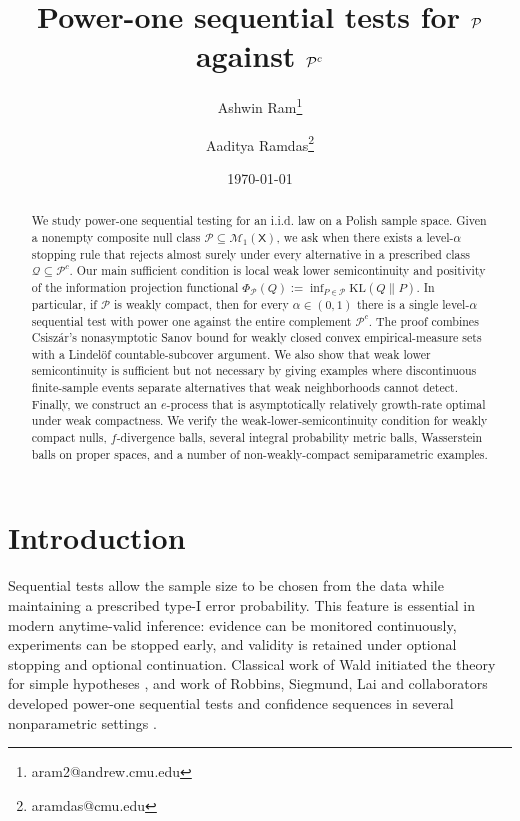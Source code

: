 \documentclass[11pt]{article}
\author[]{Ashwin Ram\thanks{aram2@andrew.cmu.edu} }
\author[]{Aaditya Ramdas\thanks{aramdas@cmu.edu}}
\affil[]{Carnegie Mellon University}
\title{Power-one sequential tests for \texorpdfstring{$\Pcal$ against $\Pcal^c$}{P against P-complement}}
\date{\today}
\newcommand{\KL}{\mathrm{KL}}
\newcommand{\Pcal}{\mathcal{P}}
\newcommand{\Qcal}{\mathcal{Q}}
\newcommand{\X}{\mathsf{X}}
\theoremstyle{definition}
\theoremstyle{definition}
\begin{document}
\maketitle


\begin{abstract}
We study power-one sequential testing for an i.i.d. law on a Polish sample space.  Given a nonempty composite null class $\Pcal\subseteq\mathcal M_1(\X)$, we ask when there exists a level-$\alpha$ stopping rule that rejects almost surely under every alternative in a prescribed class $\Qcal\subseteq\Pcal^c$.  Our main sufficient condition is local weak lower semicontinuity and positivity of the information projection functional
\(
\Phi_\Pcal(Q):=\inf_{P\in\Pcal}\KL(Q\|P).
\)
In particular, if $\Pcal$ is weakly compact, then for every $\alpha\in(0,1)$ there is a single level-$\alpha$ sequential test with power one against the entire complement $\Pcal^c$.  The proof combines Csisz\'ar's nonasymptotic Sanov bound for weakly closed convex empirical-measure sets with a Lindel\"of countable-subcover argument.  We also show that weak lower semicontinuity is sufficient but not necessary by giving examples where discontinuous finite-sample events separate alternatives that weak neighborhoods cannot detect.
Finally, we construct an $e$-process that is asymptotically relatively growth-rate optimal under weak compactness.  
We verify the weak-lower-semicontinuity condition for weakly compact nulls, $f$-divergence balls, several integral probability metric balls, Wasserstein balls on proper spaces, and a number of non-weakly-compact semiparametric examples.
\end{abstract}



\section{Introduction}
Sequential tests allow the sample size to be chosen from the data while maintaining a prescribed type-I error probability.  This feature is essential in modern anytime-valid inference: evidence can be monitored continuously, experiments can be stopped early, and validity is retained under optional stopping and optional continuation.  Classical work of Wald initiated the theory for simple hypotheses \parencite{wald1945}, and work of Robbins, Siegmund, Lai and collaborators developed power-one sequential tests and confidence sequences in several nonparametric  settings \parencite{darlingrobbins1967, darlingrobbins1967iterated, darlingrobbins1968, robbins1970, robbins_siegmund_1970, robbins_siegmund_1974, lai1976, lai1977}.
\end{document}
